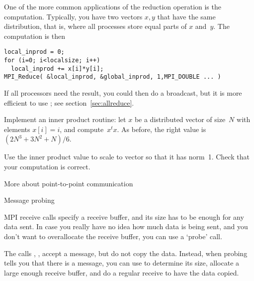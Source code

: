 One of the more common applications of the reduction operation
is the  computation. Typically, you have two vectors $x,y$
that have the same distribution, that is,
where all processes store equal parts of $x$ and~$y$.
The computation is then
\begin{verbatim}
local_inprod = 0;
for (i=0; i<localsize; i++)
  local_inprod += x[i]*y[i];
MPI_Reduce( &local_inprod, &global_inprod, 1,MPI_DOUBLE ... ) 
\end{verbatim}
If all processors need the result, you could then do a broadcast,
but it is more efficient to use ; 
see section~\ref{sec:allreduce}.

\begin{exercise}
  \label{ex:inproduct}
  Implement an inner product routine: let $x$ be a
  distributed vector of size~$N$ with elements $x[i]=i$,
  and compute~$x^tx$.
  As before, the right value is $(2N^3+3N^2+N)/6$.

  Use the inner product value to scale to vector so that it has
  norm~1.
  Check that your computation is correct.
\end{exercise}





 {More about point-to-point communication}

 {Message probing}

MPI receive calls specify a receive buffer, and its size has to be
enough for any data sent. In case you really have no idea how much data
is being sent, and you don't want to overallocate the receive buffer,
you can use a `probe' call.

The calls , , accept a message,
but do not copy the data. Instead, when probing tells you that there is a
message, you can use  to determine its size,
allocate a large enough receive buffer, and do a regular receive to
have the data copied.



